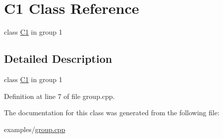 \hypertarget{class_c1}{}\section{C1 Class Reference}
\label{class_c1}


class \hyperlink{class_c1}{C1} in group 1  




\subsection{Detailed Description}
class \hyperlink{class_c1}{C1} in group 1 

Definition at line 7 of file group.\+cpp.



The documentation for this class was generated from the following file\+:\begin{DoxyCompactItemize}
\item 
examples/\hyperlink{group_8cpp}{group.\+cpp}\end{DoxyCompactItemize}
